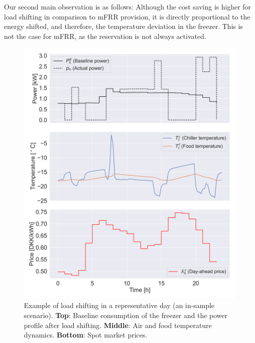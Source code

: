 \documentclass[11pt,a4paper]{article}
\begin{document}
Our second main observation is as follows: Although the cost saving is higher for load shifting in comparison to mFRR  provision, it is directly proportional to the energy shifted, and therefore, the temperature deviation in the freezer. This is not the case for mFRR, as the reservation is not always activated.


\begin{figure}[H]
    \centering
    \includegraphics[width=\columnwidth]{figures/spot_single_case.png}
    \caption{Example of load shifting in a representative day (an in-sample scenario). \textbf{Top}: Baseline consumption of the freezer and the power profile after load shifting. \textbf{Middle}: Air and food temperature dynamics. \textbf{Bottom}: Spot market prices.}
    \label{fig:fig_first_case}
\end{figure}
\end{document}
